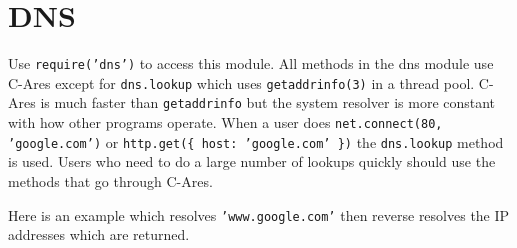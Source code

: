\section{DNS}

\begin{Shaded}
\begin{Highlighting}[]
\NormalTok{: } 
\end{Highlighting}
\end{Shaded}

Use \texttt{require('dns')} to access this module. All methods in the
dns module use C-Ares except for \texttt{dns.lookup} which uses
\texttt{getaddrinfo(3)} in a thread pool. C-Ares is much faster than
\texttt{getaddrinfo} but the system resolver is more constant with how
other programs operate. When a user does
\texttt{net.connect(80, 'google.com')} or
\texttt{http.get(\{ host: 'google.com' \})} the \texttt{dns.lookup}
method is used. Users who need to do a large number of lookups quickly
should use the methods that go through C-Ares.

Here is an example which resolves \texttt{'www.google.com'} then reverse
resolves the IP addresses which are returned.

\begin{Shaded}
\begin{Highlighting}[]
 \NormalTok{);}

\NormalTok{(}\NormalTok{, } 
    

  \NormalTok{(} \NormalTok{+ }

  \NormalTok{(} 
     
       
         
      \NormalTok{\}}

      \NormalTok{(}  \NormalTok{+ }
    \NormalTok{\});}
  \NormalTok{\});}
\NormalTok{\});}
\end{Highlighting}
\end{Shaded}

